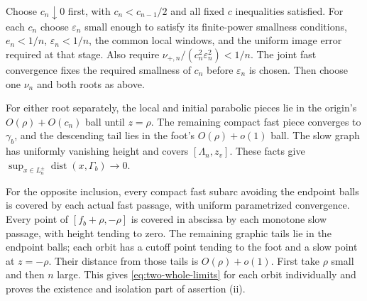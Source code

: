 Choose $c_n\downarrow0$ first, with $c_n<c_{n-1}/2$ and
all fixed $c$ inequalities satisfied. For each $c_n$ choose
$\varepsilon_n$ small enough to satisfy its finite-power smallness conditions,
$e_n<1/n$, $\varepsilon_n<1/n$, the common local windows, and
the uniform image error required at that stage.
Also require $\nu_{+,n}/(c_n^2\varepsilon_n^2)<1/n$.
The joint fast convergence fixes the required smallness of $c_n$
before $\varepsilon_n$ is chosen.
Then choose one $\nu_n$ and both roots as above.

For either root separately, the local and initial parabolic pieces
lie in the origin's $O(\rho)+O(c_n)$ ball until $z=\rho$.
The remaining compact fast piece converges to $\gamma_b$, and the
descending tail lies in the foot's $O(\rho)+o(1)$ ball.
The slow graph has uniformly vanishing height and covers
$[\Lambda_n,z_v]$. These facts give
$\sup_{x\in L_n^\pm}\operatorname{dist}(x,\Gamma_b)\to0$.

For the opposite inclusion, every compact fast subarc avoiding the
endpoint balls is covered by each actual fast passage, with uniform
parametrized convergence. Every point of $[f_b+\rho,-\rho]$
is covered in abscissa by each monotone slow passage, with height
tending to zero. The remaining graphic tails lie in the endpoint
balls; each orbit has a cutoff point tending to the foot and a
slow point at $z=-\rho$. Their distance from those tails is
$O(\rho)+o(1)$. First take $\rho$ small and then $n$ large.
This gives \eqref{eq:two-whole-limits} for each orbit individually
and proves the existence and isolation part of assertion (ii).
